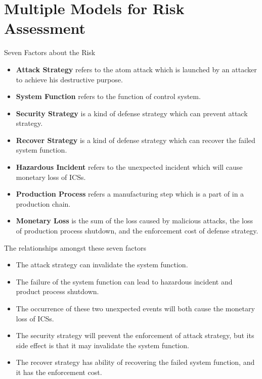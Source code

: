 \documentclass[10pt]{beamer}
\begin{document}
\section{Multiple Models for Risk Assessment}
\begin{frame}{Seven Factors about the Risk}
\vspace{10pt}\hspace{-30pt}
\begin{minipage}{1.12\textwidth}
    \begin{itemize}[<+->]
      \item \textbf{Attack Strategy} refers to the atom attack which is launched by an attacker to achieve his destructive purpose.
      \item \textbf{System Function} refers to the function of control system.
      \item \textbf{Security Strategy} is a kind of defense strategy which can prevent attack strategy.
      \item \textbf{Recover Strategy} is a kind of defense strategy which can recover the failed system function.
      \item \textbf{Hazardous Incident} refers to the unexpected incident which will cause monetary loss of ICSs.
      \item \textbf{Production Process} refers a manufacturing step which is a part of in a production chain.
      \item \textbf{Monetary Loss} is the sum of the loss caused by malicious attacks, the loss of production process shutdown, and the enforcement cost of defense strategy.
    \end{itemize}
\end{minipage}
\end{frame}

\begin{frame}{The relationships amongst these seven factors}
\vspace{10pt}\hspace{-35pt}
\begin{minipage}{0.6\textwidth}
\begin{itemize}[<+->]
  \item The attack strategy can invalidate the system function.
  \item The failure of the system function can lead to hazardous incident and product process shutdown.
  \item The occurrence of these two unexpected events will both cause the monetary loss of ICSs.
  \item The security strategy will prevent the enforcement of attack strategy, but its side effect is that it may invalidate the system function.
  \item The recover strategy has ability of recovering the failed system function, and it has the enforcement cost.
\end{itemize}
\end{minipage}
\hspace{5pt}
\begin{minipage}{0.38\textwidth}
    \scalebox{0.63}{}
\end{minipage}
\end{frame}
\end{document}
